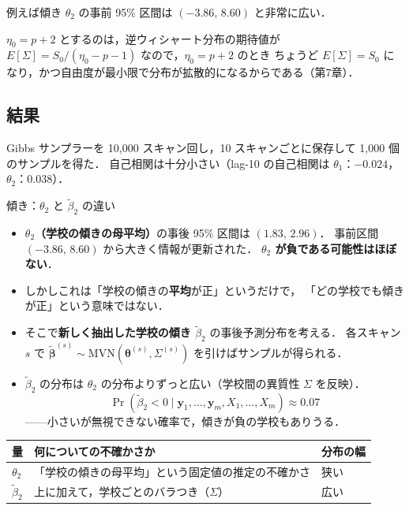 \documentclass[lualatex,ja=standard,a4paper,12pt]{bxjsarticle}
\newcommand{\mvn}{\mathrm{MVN}}
\begin{document}
\noindent 例えば傾き $\theta_2$ の事前 95\% 区間は $(-3.86,\, 8.60)$ と非常に広い．

\begin{pointbox}
$\eta_0 = p + 2$ とするのは，逆ウィシャート分布の期待値が
$E[\Sigma] = S_0/(\eta_0 - p - 1)$ なので，$\eta_0 = p+2$ のとき
ちょうど $E[\Sigma] = S_0$ になり，かつ自由度が最小限で分布が拡散的になるからである（第7章）．
\end{pointbox}

\subsection{結果}

Gibbs サンプラーを 10,000 スキャン回し，10 スキャンごとに保存して 1,000 個のサンプルを得た．
自己相関は十分小さい（lag-10 の自己相関は $\theta_1$：$-0.024$，$\theta_2$：$0.038$）．

\begin{exbox}{傾き：$\theta_2$ と $\tilde{\beta}_2$ の違い}
\begin{itemize}
  \item \textbf{$\theta_2$（学校の傾きの母平均）}の事後 95\% 区間は $(1.83,\, 2.96)$．
        事前区間 $(-3.86,\, 8.60)$ から大きく情報が更新された．
        \textbf{$\theta_2$ が負である可能性はほぼない}．
  \item しかしこれは「学校の傾きの\textbf{平均}が正」というだけで，
        「どの学校でも傾きが正」という意味ではない．
  \item そこで\textbf{新しく抽出した学校の傾き $\tilde{\beta}_2$} の事後予測分布を考える．
        各スキャン $s$ で $\tilde{\bm{\beta}}^{(s)} \sim \mvn(\bm{\theta}^{(s)}, \Sigma^{(s)})$ を引けばサンプルが得られる．
  \item $\tilde{\beta}_2$ の分布は $\theta_2$ の分布よりずっと広い（学校間の異質性 $\Sigma$ を反映）．
        \[
          \Pr(\tilde{\beta}_2 < 0 \mid \bm{y}_1, \ldots, \bm{y}_m, X_1, \ldots, X_m) \approx 0.07
        \]
        ——小さいが無視できない確率で，傾きが負の学校もありうる．
\end{itemize}
\end{exbox}

\begin{center}
\renewcommand{\arraystretch}{1.5}
\begin{tabular}{lll}
\toprule
量 & 何についての不確かさか & 分布の幅 \\
\midrule
$\theta_2$ & 「学校の傾きの母平均」という固定値の推定の不確かさ & 狭い \\
$\tilde{\beta}_2$ & 上に加えて，学校ごとのバラつき（$\Sigma$） & 広い \\
\bottomrule
\end{tabular}
\end{center}
\end{document}
